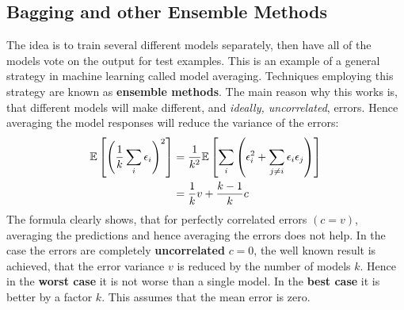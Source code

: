 \begin{multicols}{2}
	\subsection{Bagging and other Ensemble Methods}
	The idea is to train several different models separately, then have all of the models vote on the output for test examples.
	This is an example of a general strategy in machine learning called model averaging. Techniques employing this strategy are known as \textbf{ensemble methods}.
	The main reason why this works is, that different models will make different, and \emph{ideally, uncorrelated}, errors. Hence averaging the model responses will reduce the variance of the errors:
	\begin{align*}
	\mathbb{E}\left[\left(\frac{1}{k}\sum_i\epsilon_i\right)^2\right]
	&= \frac{1}{k^2}\mathbb{E}\left[\sum_i\left(\epsilon_i^2+\sum_{j\neq i}\epsilon_i\epsilon_j\right)\right]\\
	&= \frac{1}{k}v+\frac{k-1}{k}c
	\end{align*}
	The formula clearly shows, that for perfectly correlated errors $(c=v)$, averaging the predictions and hence averaging the errors does not help.
	In the case the errors are completely \textbf{uncorrelated} $c=0$, the well known result is achieved, that the error variance $v$ is reduced by the number of models $k$.
	Hence in the \textbf{worst case} it is not worse than a single model. 
	In the \textbf{best case} it is better by a factor $k$. This assumes that the mean error is zero.\\
	

\end{multicols}
